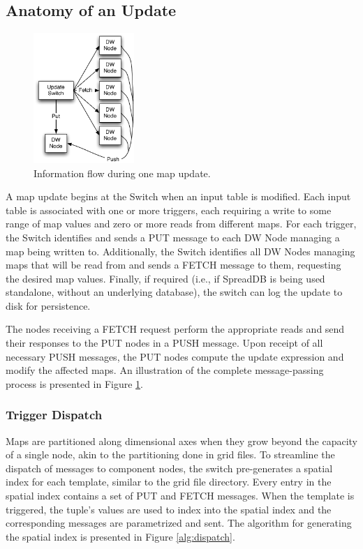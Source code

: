 \documentclass{sig-alternate}
\begin{document}
\subsection{Anatomy of an Update}

\begin{figure}
\begin{center}
\includegraphics[width=1.5in]{images/UpdateStep.pdf}
\caption{Information flow during one map update.}
\label{fig:updatestep}
\end{center}
\end{figure}

A map update begins at the Switch when an input table is modified.  Each input table is associated with one or more triggers, each requiring a write to some range of map values and zero or more reads from different maps.  For each trigger, the Switch identifies and sends a PUT message to each DW Node managing a map being written to.  Additionally, the Switch identifies all DW Nodes managing maps that will be read from and sends a FETCH message to them, requesting the desired map values.  Finally, if required (i.e., if SpreadDB is being used standalone, without an underlying database), the switch can log the update to disk for persistence.

The nodes receiving a FETCH request perform the appropriate reads and send their responses to the PUT nodes in a PUSH message.  Upon receipt of all necessary PUSH messages, the PUT nodes compute the update expression and modify the affected maps.  An illustration of the complete message-passing process is presented in Figure \ref{fig:updatestep}.  

\subsubsection{Trigger Dispatch}
Maps are partitioned along dimensional axes when they grow beyond the capacity of a single node, akin to the partitioning done in grid files\cite{318586}.  To streamline the dispatch of messages to component nodes, the switch pre-generates a spatial index for each template, similar to the grid file directory.  Every entry in the spatial index contains a set of PUT and FETCH messages.  When the template is triggered, the tuple's values are used to index into the spatial index and the corresponding messages are parametrized and sent.  The algorithm for generating the spatial index is presented in Figure \ref{alg:dispatch}.
\end{document}
